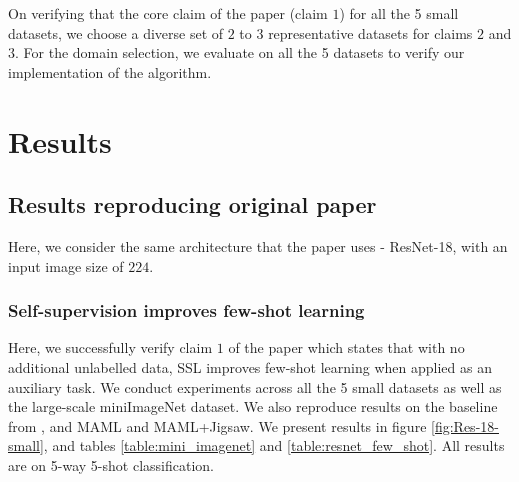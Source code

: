 On verifying that the core claim of the paper (claim $1$) for all the 5 small datasets, we choose a diverse set of $2$ to $3$ representative datasets for claims $2$ and $3$. For the domain selection, we evaluate on all the 5 datasets to verify our implementation of the algorithm.

\section{Results}
\label{sec:results}
\subsection{Results reproducing original paper}
Here, we consider the same architecture that the paper uses - ResNet-18, with an input image size of $224$.
\subsubsection{Self-supervision improves few-shot learning}
Here, we successfully verify claim $1$ of the paper which states that with no additional unlabelled data, SSL improves few-shot learning when applied as an auxiliary task. We conduct experiments across all the 5 small datasets as well as the large-scale miniImageNet dataset. We also reproduce results on the baseline from \cite{chen2018a}, and MAML and MAML+Jigsaw. We present results in figure \ref{fig:Res-18-small}, and tables \ref{table:mini_imagenet} and \ref{table:resnet_few_shot}. All results are on 5-way 5-shot classification.

\begin{table}
	\begin{minipage}{0.45\linewidth}
      \centering

		\label{fig:Res-18-small}
	\end{minipage}\hfill
	\begin{minipage}{0.45\linewidth}
      \centering

        \caption{miniImageNet Results with ResNet-18}
        \label{table:mini_imagenet}
	\end{minipage}
\end{table}

